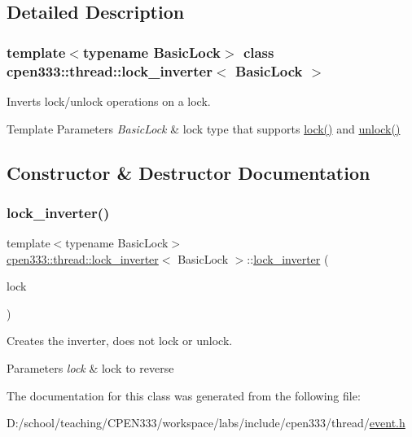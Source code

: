 \subsection{Detailed Description}
\subsubsection*{template$<$typename Basic\+Lock$>$\newline
class cpen333\+::thread\+::lock\+\_\+inverter$<$ Basic\+Lock $>$}

Inverts lock/unlock operations on a lock. 


\begin{DoxyTemplParams}{Template Parameters}
{\em Basic\+Lock} & lock type that supports \hyperlink{classcpen333_1_1thread_1_1lock__inverter_a35bd789432239cd8c9beb0e9b40811d8}{lock()} and \hyperlink{classcpen333_1_1thread_1_1lock__inverter_ae66d4cf112d29ad1b043e4a467a601d3}{unlock()} \\
\hline
\end{DoxyTemplParams}


\subsection{Constructor \& Destructor Documentation}
\mbox{\label{classcpen333_1_1thread_1_1lock__inverter_a0da2124d7f554577aa612c63ac9f74bf}} 
\subsubsection{\texorpdfstring{lock\+\_\+inverter()}{lock\_inverter()}}
{\footnotesize\ttfamily template$<$typename Basic\+Lock$>$ \\
\hyperlink{classcpen333_1_1thread_1_1lock__inverter}{cpen333\+::thread\+::lock\+\_\+inverter}$<$ Basic\+Lock $>$\+::\hyperlink{classcpen333_1_1thread_1_1lock__inverter}{lock\+\_\+inverter} (\begin{DoxyParamCaption}\item[{Basic\+Lock \&}]{lock }\end{DoxyParamCaption})\hspace{0.3cm}{\ttfamily [inline]}}



Creates the inverter, does not lock or unlock. 


\begin{DoxyParams}{Parameters}
{\em lock} & lock to reverse \\
\hline
\end{DoxyParams}


The documentation for this class was generated from the following file\+:\begin{DoxyCompactItemize}
\item 
D\+:/school/teaching/\+C\+P\+E\+N333/workspace/labs/include/cpen333/thread/\hyperlink{thread_2event_8h}{event.\+h}\end{DoxyCompactItemize}
